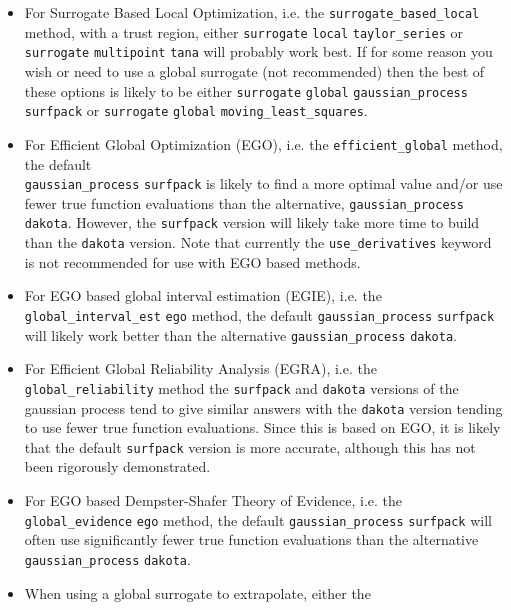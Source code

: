 \begin{itemize}
\item For Surrogate Based Local Optimization, i.e. the 
      \texttt{surrogate\_based\_local} method, with a trust region, either
      \texttt{surrogate} \texttt{local} \texttt{taylor\_series} or
      \texttt{surrogate} \texttt{multipoint} \texttt{tana} will probably 
      work best.  If for some reason you wish or need to use a global 
      surrogate (not recommended) then the best of these options is likely 
      to be either 
      \texttt{surrogate} \texttt{global} 
      \texttt{gaussian\_process} \texttt{surfpack} or
      \texttt{surrogate} \texttt{global} \texttt{moving\_least\_squares}.
\item For Efficient Global Optimization (EGO), i.e. the 
      \texttt{efficient\_global} method, the default\\
      \texttt{gaussian\_process} \texttt{surfpack}  
      is likely to find a more optimal value and/or use fewer true 
      function evaluations than the alternative,
      \texttt{gaussian\_process} \texttt{dakota}.  However, the 
      \texttt{surfpack} version will likely take more time to build 
      than the \texttt{dakota} version.  Note that currently the 
      \texttt{use\_derivatives} keyword is not recommended for use with
      EGO based methods.
\item For EGO based global interval estimation (EGIE), i.e. the 
      \texttt{global\_interval\_est} \texttt{ego} method, 
      the default \texttt{gaussian\_process} \texttt{surfpack} will
      likely work better than the alternative \texttt{gaussian\_process} 
      \texttt{dakota}.
\item For Efficient Global Reliability Analysis (EGRA), i.e. the 
      \texttt{global\_reliability} method the \texttt{surfpack} and 
      \texttt{dakota} versions of the gaussian process tend to give 
      similar answers with the \texttt{dakota} version tending to use
      fewer true function evaluations.  Since this is based on EGO, it
      is likely that the default \texttt{surfpack} version is more 
      accurate, although this has not been rigorously demonstrated.
\item For EGO based Dempster-Shafer Theory of Evidence, i.e. the 
      \texttt{global\_evidence} \texttt{ego} method, the default
      \texttt{gaussian\_process} \texttt{surfpack} will often use
      significantly fewer true function evaluations than the 
      alternative \texttt{gaussian\_process} \texttt{dakota}.
\item When using a global surrogate to extrapolate, either the

\end{itemize}
